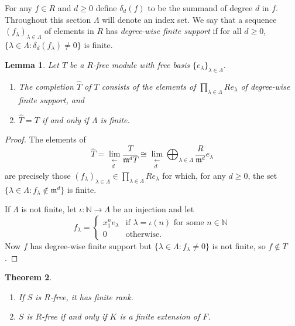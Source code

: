 \documentclass[12pt]{amsart}
\theoremstyle{plain}%
\newtheorem{thm}{Theorem}[section]
\newtheorem{lem}[thm]{Lemma}
\theoremstyle{definition}
\theoremstyle{remark}
\def\fm{{\mathfrak{m}}}
\begin{document}
For any $f\in R$ and $d\geq 0$ define $\delta_d(f)$ to be the summand of degree $d$ in $f$.
Throughout this section $\Lambda$ will denote an index set.
We say that a sequence
$\left( f_\lambda \right)_{\lambda\in\Lambda}$ of elements in $R$
has \emph{degree-wise finite support} if
for all $d\geq 0$,
$\{ \lambda \in \Lambda : \delta_d(f_\lambda) \neq 0 \}$
is finite.

\begin{lem}
Let $T$ be a $R$-free module with free basis
$\{ e_\lambda \}_{\lambda\in \Lambda}$.
\begin{enumerate}

\item[(a)] The completion $\widehat{T}$ of $T$ consists of
the elements of $\prod_{\lambda\in\Lambda} R e_\lambda$
of degree-wise finite support, and

\item[(b)] $\widehat{T}=T$ if and only if $\Lambda$ is finite.
\end{enumerate}
\end{lem}


\begin{proof}
The elements of
\[
\widehat{T}=\lim_{\substack{\longleftarrow\\d}}\frac{ T}{\fm^d T}\cong
\lim_{\substack{\longleftarrow\\d}} \bigoplus_{\lambda\in\Lambda} \frac{R}{\fm^d} e_\lambda
\]
are precisely those $(f_\lambda)_{\lambda\in\Lambda}\in \prod_{\lambda\in\Lambda} R e_\lambda$ %
for which, for any $d\geq 0$,
the set $\{ \lambda\in \Lambda : f_\lambda\notin \fm^d \}$ is finite.

If $\Lambda$ is not finite, let $\iota: \mathbb{N} \to \Lambda$ be an injection
and let
\[
f_\lambda=
\left\{
\begin{array}{ll}
x_1^n e_\lambda & \text{if } \lambda=\iota(n) \text{ for some } n\in\mathbb{N}\\
0 & \text{otherwise}.
\end{array}
\right.
\]
Now $f$ has degree-wise finite support but $\{ \lambda\in \Lambda : f_\lambda\neq 0\}$ is not finite, so $f\notin T$.
\end{proof}



\begin{thm}\label{main theorem}
\noindent
\begin{enumerate}

\item[(a)] If $S$ is $R$-free, it has finite rank.

\item[(b)] $S$ is $R$-free if and only if $K$ is a finite extension of $F$.
\end{enumerate}

\end{thm}
\end{document}
